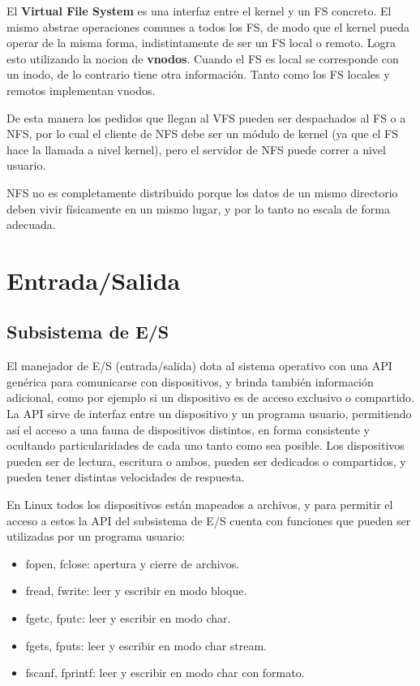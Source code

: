 \documentclass{article}
\begin{document}
El \textbf{Virtual File System} es una interfaz entre el kernel y un FS concreto. El mismo abstrae operaciones comunes a todos los FS, de modo que el kernel pueda operar de la misma forma, indistintamente de ser un FS local o remoto. Logra esto utilizando la nocion de \textbf{vnodos}. Cuando el FS es local se corresponde con un inodo, de lo contrario tiene otra información. Tanto como los FS locales y remotos implementan vnodos.

De esta manera los pedidos que llegan al VFS pueden ser despachados al FS o a NFS, por lo cual el cliente de NFS debe ser un módulo de kernel (ya que el FS hace la llamada a nivel kernel), pero el servidor de NFS puede correr a nivel usuario.

NFS no es completamente distribuido porque los datos de un mismo directorio deben vivir físicamente en un mismo lugar, y por lo tanto no escala de forma adecuada.

\section{Entrada/Salida}

\subsection{Subsistema de E/S}

El manejador de E/S (entrada/salida) dota al sistema operativo con una API genérica para comunicarse con dispositivos, y brinda también información adicional, como por ejemplo si un dispositivo es de acceso exclusivo o compartido. La API sirve de interfaz entre un dispositivo y un programa usuario, permitiendo así el acceso a una fauna de dispositivos distintos, en forma consistente y ocultando particularidades de cada uno tanto como sea posible. Los dispositivos pueden ser de lectura, escritura o ambos, pueden ser dedicados o compartidos, y pueden tener distintas velocidades de respuesta.

En Linux todos los dispositivos están mapeados a archivos, y para permitir el acceso a estos la API del subsistema de E/S cuenta con funciones que pueden ser utilizadas por un programa usuario: 

\begin{itemize}
 \item fopen, fclose: apertura y cierre de archivos.
 \item fread, fwrite: leer y escribir en modo bloque.
 \item fgetc, fputc: leer y escribir en modo char.
 \item fgets, fputs: leer y escribir en modo char stream.
 \item fscanf, fprintf: leer y escribir en modo char con formato.
\end{itemize}
\end{document}

